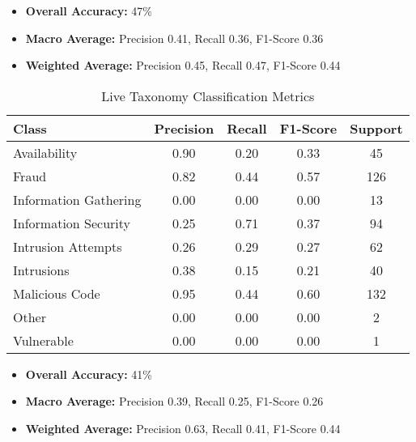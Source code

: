 \begin{itemize}
    \item \textbf{Overall Accuracy:} 47\%
    \item \textbf{Macro Average:} Precision 0.41, Recall 0.36, F1-Score 0.36
    \item \textbf{Weighted Average:} Precision 0.45, Recall 0.47, F1-Score 0.44
\end{itemize}

\begin{table}[h!]
    \centering
    \caption{Live Taxonomy Classification Metrics}
    \label{tab:live_taxonomy_metrics}
    \begin{tabular}{|l|c|c|c|c|}
    \hline
    \textbf{Class} & \textbf{Precision} & \textbf{Recall} & \textbf{F1-Score} & \textbf{Support} \\
    \hline
    Availability & 0.90 & 0.20 & 0.33 & 45 \\
    \hline
    Fraud & 0.82 & 0.44 & 0.57 & 126 \\
    Information Gathering & 0.00 & 0.00 & 0.00 & 13 \\
    \hline
    Information Security & 0.25 & 0.71 & 0.37 & 94 \\
    Intrusion Attempts & 0.26 & 0.29 & 0.27 & 62 \\
    Intrusions & 0.38 & 0.15 & 0.21 & 40 \\
    Malicious Code & 0.95 & 0.44 & 0.60 & 132 \\
    Other & 0.00 & 0.00 & 0.00 & 2 \\
    Vulnerable & 0.00 & 0.00 & 0.00 & 1 \\
    \hline
    \end{tabular}
\end{table}

\begin{itemize}
    \item \textbf{Overall Accuracy:} 41\%
    \item \textbf{Macro Average:} Precision 0.39, Recall 0.25, F1-Score 0.26
    \item \textbf{Weighted Average:} Precision 0.63, Recall 0.41, F1-Score 0.44
\end{itemize}